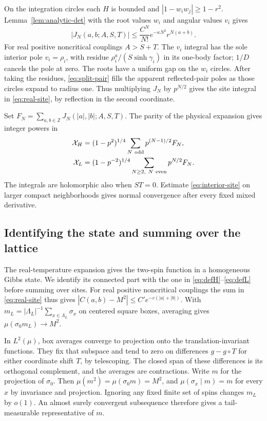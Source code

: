 \documentclass[11pt]{article}
\numberwithin{equation}{section}
\theoremstyle{definition}
\newcommand{\Z}{\mathbb Z}
\begin{document}
On the integration circles each $H$ is bounded and
$|1-w_iw_j|\ge 1-r^2$. Lemma~\ref{lem:analytic-det} with the
root values $w_i$ and angular values $v_i$ gives
\begin{equation}\label{eq:interior-site}
 |J_N(a,b;A,S,T)|\le\frac{C^N}{N!}e^{-\kappa N^2}r^{N(a+b)} .
\end{equation}
For real positive noncritical couplings $A>S+T$. The $v_i$ integral
has the sole interior pole $v_i=\rho_i$, with residue
$\rho_i^a/(S\sinh\gamma_i)$ in its one-body factor; $1/D$ cancels
the pole at zero. The roots have a uniform gap on the $w_i$ circles.
After taking the residues, \eqref{eq:split-pair} fills the apparent
reflected-pair poles as those circles expand to radius one.
Thus multiplying $J_N$ by $p^{N/2}$ gives the site integral in
\eqref{eq:real-site}, by reflection in the second coordinate.

Set $F_N=\sum_{a,b\in\Z}J_N(|a|,|b|;A,S,T)$. The parity of the
physical expansion gives integer powers in
\begin{align}
 \mathcal X_H&=(1-p^2)^{1/4}\sum_{N\ {\rm odd}}p^{(N-1)/2}F_N,
                  \label{eq:global-seriesH}\\
 \mathcal X_L&=(1-p^{-2})^{1/4}\sum_{N\ge2,\ N\ {\rm even}}p^{N/2}F_N.
                  \label{eq:global-series}
\end{align}
The integrals are holomorphic also when $ST=0$. Estimate
\eqref{eq:interior-site} on larger compact neighborhoods gives normal
convergence after every fixed mixed derivative.

\subsection{Identifying the state and summing over the lattice}\label{sec:lattice-sum}

The real-temperature expansion gives the two-spin function in a
homogeneous Gibbs state. We identify its connected part with the
one in \eqref{eq:defH}--\eqref{eq:defL} before summing over sites.
For real positive noncritical couplings the sum in \eqref{eq:real-site}
thus gives $|C(a,b)-M^2|\le C'e^{-c(|a|+|b|)}$. With
$m_L=|\Lambda_L|^{-1}\sum_{x\in\Lambda_L}\sigma_x$ on centered
square boxes, averaging gives $\mu(\sigma_0m_L)\to M^2$.

In $L^2(\mu)$, box averages converge to projection onto the
translation-invariant functions. They fix that subspace and tend
to zero on differences $g-g\circ T$ for either coordinate shift
$T$, by telescoping. The closed span of these differences is its
orthogonal complement, and the averages are contractions. Write
$m$ for the projection of $\sigma_0$. Then
$\mu(m^2)=\mu(\sigma_0m)=M^2$, and
$\mu(\sigma_x\mid m)=m$ for every $x$ by invariance and projection.
Ignoring any fixed finite set of spins changes $m_L$ by $o(1)$.
An almost surely convergent subsequence therefore gives a
tail-measurable representative of $m$.
\end{document}
